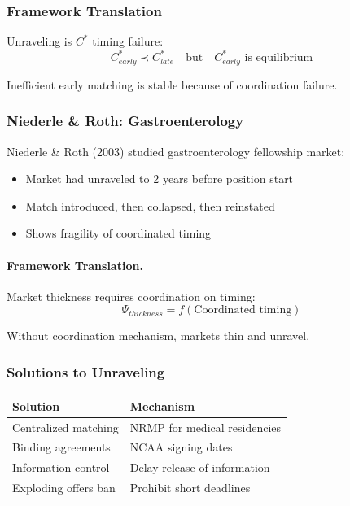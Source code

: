 \subsubsection{Framework Translation}

Unraveling is $C^*$ timing failure:
\begin{equation}
C^*_{early} \prec C^*_{late} \quad \text{but} \quad C^*_{early} \text{ is equilibrium}
\end{equation}

Inefficient early matching is stable because of coordination failure.

\subsubsection{Niederle \& Roth: Gastroenterology}

Niederle \& Roth (2003) studied gastroenterology fellowship market:
\begin{itemize}
    \item Market had unraveled to 2 years before position start
    \item Match introduced, then collapsed, then reinstated
    \item Shows fragility of coordinated timing
\end{itemize}

\paragraph{Framework Translation.}
Market thickness requires coordination on timing:
\begin{equation}
\Psi_{thickness} = f(\text{Coordinated timing})
\end{equation}

Without coordination mechanism, markets thin and unravel.

\subsubsection{Solutions to Unraveling}

\begin{center}
\renewcommand{\arraystretch}{1.3}
\begin{tabular}{|l|l|}
\hline
\textbf{Solution} & \textbf{Mechanism} \\
\hline
Centralized matching & NRMP for medical residencies \\
Binding agreements & NCAA signing dates \\
Information control & Delay release of information \\
Exploding offers ban & Prohibit short deadlines \\
\hline
\end{tabular}
\end{center}

